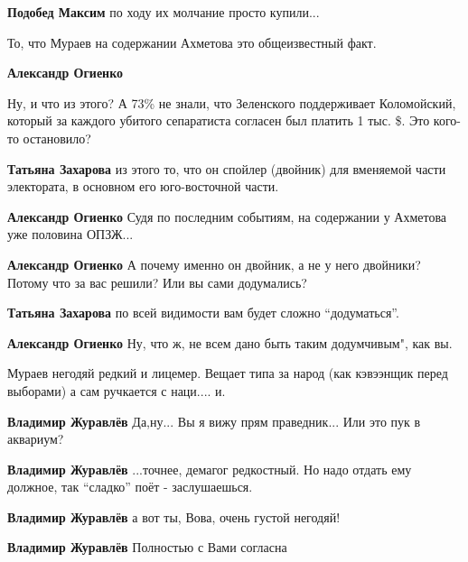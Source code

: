 \begin{itemize}
\begin{itemize}
\textbf{Подобед Максим} по ходу их молчание просто купили...

\end{itemize} %


То, что Мураев на содержании Ахметова это общеизвестный факт.

\begin{itemize} %
\textbf{Александр Огиенко} 

Ну, и что из этого? А 73\% не знали, что Зеленского поддерживает Коломойский,
который за каждого убитого сепаратиста согласен был платить 1 тыс. \$. Это
кого-то остановило?


\textbf{Татьяна Захарова} из этого то, что он спойлер (двойник) для вменяемой части электората, в основном его юго-восточной части.

\textbf{Александр Огиенко} Судя по последним событиям, на содержании у Ахметова уже половина ОПЗЖ...

\textbf{Александр Огиенко} А почему именно он двойник, а не у него двойники? Потому что за вас решили? Или вы сами додумались?

\textbf{Татьяна Захарова} по всей видимости вам будет сложно \enquote{додуматься}.

\textbf{Александр Огиенко} Ну, что ж, не всем дано быть таким додумчивым", как вы.
\end{itemize} %


Мураев негодяй редкий и лицемер. Вещает типа за народ (как кэвээнщик перед
выборами) а сам ручкается с наци.... и.

\begin{itemize} %
\textbf{Владимир Журавлёв} Да,ну... Вы я вижу прям праведник... Или это пук в аквариум?

\textbf{Владимир Журавлёв} ...точнее, демагог редкостный. Но надо отдать ему должное, так \enquote{сладко} поёт - заслушаешься.

\textbf{Владимир Журавлёв} а вот ты, Вова, очень густой негодяй!

\textbf{Владимир Журавлёв} Полностью с Вами согласна
\end{itemize} %


\end{itemize}
